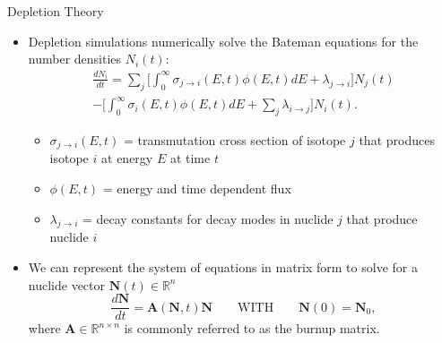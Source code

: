 \documentclass[9pt,t,aspectratio=169]{beamer}
\newcommand{\QWITH}{\qquad \text{WITH} \qquad}
\begin{document}
\begin{frame}{Depletion Theory}
    \begin{itemize}
        \item Depletion simulations numerically solve the Bateman equations for the number densities $N_{i}(t)$:
        \begin{multline} \label{eq:batemen}
            \frac{dN_{i}}{dt} =
            \sum_{j} \bigg[\int_{0}^{\infty} \sigma_{j\rightarrow{i}}(E,t)\phi(E,t)dE + \lambda_{j\rightarrow{i}}\bigg]N_{j}(t) \\
            -\bigg[\int_{0}^{\infty} \sigma_{i}(E,t)\phi(E,t)dE
            +\sum_{j}\lambda_{i\rightarrow{j}}\bigg] N_{i}(t).
        \end{multline}
        \begin{itemize}
            \item $\sigma_{j\rightarrow{i}}(E,t)$ = transmutation cross section of isotope $j$ that produces isotope $i$ at energy $E$ at time $t$
            \item $\phi(E,t)$ = energy and time dependent flux
            \item $\lambda_{j\rightarrow{i}}$ = decay constants for decay modes in nuclide $j$ that produce nuclide $i$
        \end{itemize}
        \item We can represent the system of equations in matrix form to solve for a nuclide vector $\textbf{N}(t)\in\mathbb{R}^{n}$
        \begin{equation} \label{eq:burnup matrix odes}
            \frac{d\textbf{N}}{dt} =
            \textbf{A}(\textbf{N},t) \textbf{N}
            \QWITH
            \textbf{N}(0) = \textbf{N}_{0},
        \end{equation}
        where $\textbf{A}\in\mathbb{R}^{n\times n}$ is commonly referred to as the burnup matrix.
    \end{itemize}
\end{frame}
\end{document}
